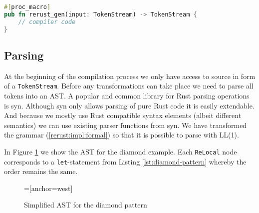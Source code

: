 \begin{lstlisting}[language=Rust,style=colouredRust,caption=Procedural macros,label=lst:procmacro]
#[proc_macro]
pub fn rerust_gen(input: TokenStream) -> TokenStream {
    // compiler code
}
\end{lstlisting}

\subsection{Parsing}
At the beginning of the compilation process we only have access to \rerust source in form of a \lstinline{TokenStream}. Before any transformations can take place we need to parse all tokens into an \ac{AST}. A popular and common library for Rust parsing operations is \textsf{syn}. Although \textsf{syn} only allows parsing of pure Rust code it is easily extendable. And because we mostly use Rust compatible syntax elements (albeit different semantics) we can use existing parser functions from \textsf{syn}. We have transformed the grammar (\ref{rerust:impl:formal}) so that it is possible to parse with LL(1). 

In Figure \ref{fig:diamond-ast} we show the \ac{AST} for the diamond example. Each \lstinline{ReLocal} node corresponds to a \lstinline{let}-statement from Listing \ref{lst:diamond-pattern} whereby the order remains the same.

\begin{figure}[htpb]
=[anchor=west]
    \centering
    \caption{Simplified AST for the diamond pattern}
    \label{fig:diamond-ast}
\end{figure}

